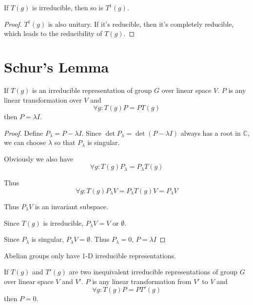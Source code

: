 \documentclass[12pt]{book}
\begin{document}
	\begin{lemma}
		If $T(g)$ is irreducible, then so is $T^\dagger(g)$. 
	\end{lemma}
	\begin{proof}
		 $T^\dagger(g)$ is also unitary. If it's reducible, then it's completely reducible, which leads to the reducibility of $T(g)$.
	\end{proof}
	\section{Schur's Lemma}
	\begin{lemma}[Schur]
		If $T(g)$ is an irreducible representation of group $G$ over linear space $V$. $P$ is any linear transformation over $V$ and
		\begin{equation}
			\forall g:T(g)P=PT(g)
		\end{equation}
		then $P=\lambda I$.
	\end{lemma}
	\begin{proof}
		Define $P_\lambda=P-\lambda I$. Since $\det P_\lambda=\det(P-\lambda I)$ always has a root in $\mathbb C$, we can choose $\lambda$ so that $P_\lambda$ is singular.
		
		Obviously we also have
		\begin{equation}
			\forall g:T(g)P_\lambda=P_\lambda T(g)
		\end{equation}
		
		Thus
		\begin{equation}
		\forall g:T(g)P_\lambda V=P_\lambda T(g)V=P_\lambda V
		\end{equation}
		
		Thus $P_\lambda V$ is an invariant subspace.
		
		Since $T(g)$ is irreducible, $P_\lambda V=V$ or $\emptyset$.
		
		Since $P_\lambda$ is singular, $P_\lambda V=\emptyset$. Thus $P_\lambda=0$, $P=\lambda I$
	\end{proof}
	\begin{corollary}
		Abelian groups only have 1-D irreducible representations.
	\end{corollary}
	\begin{lemma}[Schur]
		If $T(g)$ and $T'(g)$ are two inequivalent irreducible representations of group $G$ over linear space $V$ and $V'$. $P$ is any linear transformation from $V'$ to $V$ and
		\begin{equation}
			\forall g:T(g)P=PT'(g)
		\end{equation}
		then $P=0$.
	\end{lemma}
\end{document}
